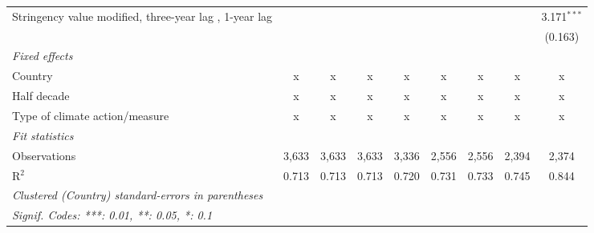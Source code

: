 \begin{table}[htbp]
\begin{tabular}{lcccccccc}
      Stringency value modified, three-year lag , 1-year lag                                               &         &             &         &              &              &               &               & 3.171$^{***}$\\   
                                                                                                           &         &             &         &              &              &               &               & (0.163)\\   
      \emph{Fixed effects}\\
      Country                                                                                              & x       & x           & x       & x            & x            & x             & x             & x\\  
      Half decade                                                                                          & x       & x           & x       & x            & x            & x             & x             & x\\  
      Type of climate action/measure                                                                       & x       & x           & x       & x            & x            & x             & x             & x\\  
      \midrule \emph{Fit statistics}\\
      Observations                                                                                         & 3,633   & 3,633       & 3,633   & 3,336        & 2,556        & 2,556         & 2,394         & 2,374\\  
      R$^2$                                                                                                & 0.713   & 0.713       & 0.713   & 0.720        & 0.731        & 0.733         & 0.745         & 0.844\\  
      \midrule
      \multicolumn{9}{l}{\emph{Clustered (Country) standard-errors in parentheses}}\\
      \multicolumn{9}{l}{\emph{Signif. Codes: ***: 0.01, **: 0.05, *: 0.1}}\\
   \end{tabular}
\end{table}


